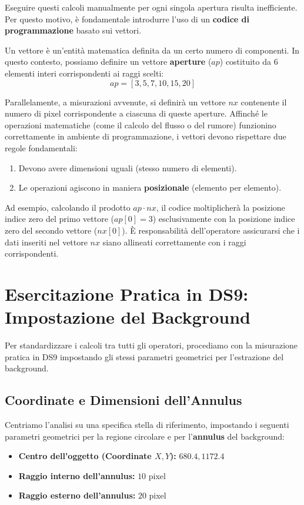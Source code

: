 Eseguire questi calcoli manualmente per ogni singola apertura risulta inefficiente. Per questo motivo, è fondamentale introdurre l'uso di un \textbf{codice di programmazione} basato sui vettori.

Un vettore è un'entità matematica definita da un certo numero di componenti. In questo contesto, possiamo definire un vettore \textbf{aperture} ($ap$) costituito da 6 elementi interi corrispondenti ai raggi scelti:
\begin{equation}
ap = [3, 5, 7, 10, 15, 20]
\end{equation}

Parallelamente, a misurazioni avvenute, si definirà un vettore $nx$ contenente il numero di pixel corrispondente a ciascuna di queste aperture.
Affinché le operazioni matematiche (come il calcolo del flusso o del rumore) funzionino correttamente in ambiente di programmazione, i vettori devono rispettare due regole fondamentali:
\begin{enumerate}
\item Devono avere dimensioni uguali (stesso numero di elementi).
\item Le operazioni agiscono in maniera \textbf{posizionale} (elemento per elemento).
\end{enumerate}
Ad esempio, calcolando il prodotto $ap \cdot nx$, il codice moltiplicherà la posizione indice zero del primo vettore ($ap[0] = 3$) esclusivamente con la posizione indice zero del secondo vettore ($nx[0]$). È responsabilità dell'operatore assicurarsi che i dati inseriti nel vettore $nx$ siano allineati correttamente con i raggi corrispondenti.

\section{Esercitazione Pratica in DS9: Impostazione del Background}

Per standardizzare i calcoli tra tutti gli operatori, procediamo con la misurazione pratica in DS9 impostando gli stessi parametri geometrici per l'estrazione del background.

\subsection{Coordinate e Dimensioni dell'Annulus}
Centriamo l'analisi su una specifica stella di riferimento, impostando i seguenti parametri geometrici per la regione circolare e per l'\textbf{annulus} del background:
\begin{itemize}
\item \textbf{Centro dell'oggetto (Coordinate $X, Y$):} $680.4, 1172.4$
\item \textbf{Raggio interno dell'annulus:} $10$ pixel
\item \textbf{Raggio esterno dell'annulus:} $20$ pixel
\end{itemize}

